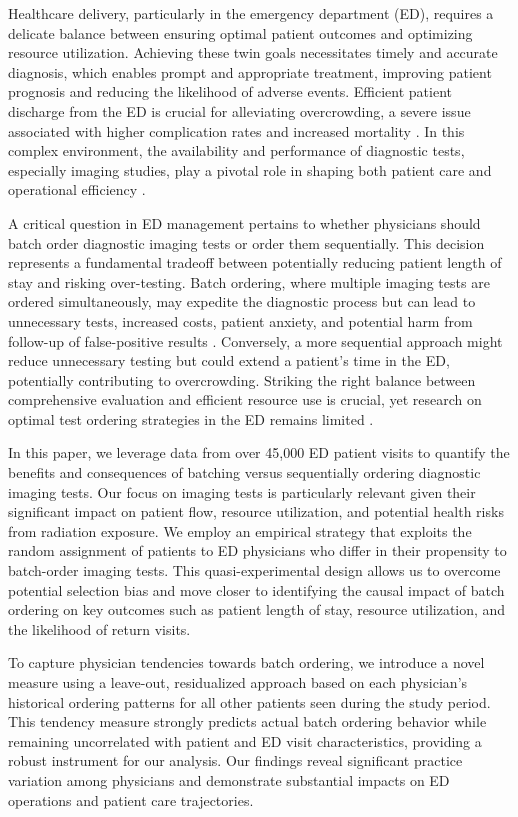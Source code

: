 \documentclass[,,nonblindrev]{informs}
\begin{document}
Healthcare delivery, particularly in the emergency department (ED),
requires a delicate balance between ensuring optimal patient outcomes
and optimizing resource utilization. Achieving these twin goals
necessitates timely and accurate diagnosis, which enables prompt and
appropriate treatment, improving patient prognosis and reducing the
likelihood of adverse events. Efficient patient discharge from the ED is
crucial for alleviating overcrowding, a severe issue associated with
higher complication rates and increased mortality \citet{bernstein2009}.
In this complex environment, the availability and performance of
diagnostic tests, especially imaging studies, play a pivotal role in
shaping both patient care and operational efficiency \citet{naseim2015}.

A critical question in ED management pertains to whether physicians
should batch order diagnostic imaging tests or order them sequentially.
This decision represents a fundamental tradeoff between potentially
reducing patient length of stay and risking over-testing. Batch
ordering, where multiple imaging tests are ordered simultaneously, may
expedite the diagnostic process but can lead to unnecessary tests,
increased costs, patient anxiety, and potential harm from follow-up of
false-positive results \citet{koch2018}. Conversely, a more sequential
approach might reduce unnecessary testing but could extend a patient's
time in the ED, potentially contributing to overcrowding. Striking the
right balance between comprehensive evaluation and efficient resource
use is crucial, yet research on optimal test ordering strategies in the
ED remains limited \citet{saghafian2015}.

In this paper, we leverage data from over 45,000 ED patient visits to
quantify the benefits and consequences of batching versus sequentially
ordering diagnostic imaging tests. Our focus on imaging tests is
particularly relevant given their significant impact on patient flow,
resource utilization, and potential health risks from radiation
exposure. We employ an empirical strategy that exploits the random
assignment of patients to ED physicians who differ in their propensity
to batch-order imaging tests. This quasi-experimental design allows us
to overcome potential selection bias and move closer to identifying the
causal impact of batch ordering on key outcomes such as patient length
of stay, resource utilization, and the likelihood of return visits.

To capture physician tendencies towards batch ordering, we introduce a
novel measure using a leave-out, residualized approach based on each
physician's historical ordering patterns for all other patients seen
during the study period. This tendency measure strongly predicts actual
batch ordering behavior while remaining uncorrelated with patient and ED
visit characteristics, providing a robust instrument for our analysis.
Our findings reveal significant practice variation among physicians and
demonstrate substantial impacts on ED operations and patient care
trajectories.
\end{document}
